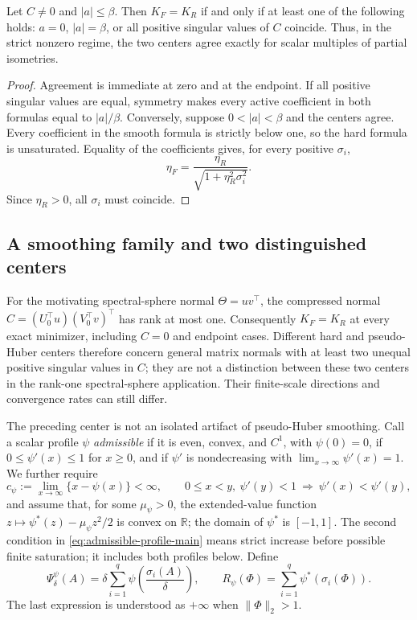 \begin{corollary}
\label{cor:center-agreement-main}
Let \(C\ne0\) and \(|a|\le\beta\).  Then \(K_F=K_R\) if and only if at least
one of the following holds: \(a=0\), \(|a|=\beta\), or all positive singular
values of \(C\) coincide.  Thus, in the strict nonzero regime, the two centers
agree exactly for scalar multiples of partial isometries.
\end{corollary}

\begin{proof}
Agreement is immediate at zero and at the endpoint.  If all positive singular
values are equal, symmetry makes every active coefficient in both formulas
equal to \(|a|/\beta\).  Conversely, suppose
\(0<|a|<\beta\) and the centers agree.  Every coefficient in the smooth
formula is strictly below one, so the hard formula is unsaturated.  Equality
of the coefficients gives, for every positive \(\sigma_i\),
\[
 \eta_F=\frac{\eta_R}{\sqrt{1+\eta_R^2\sigma_i^2}}.
\]
Since \(\eta_R>0\), all \(\sigma_i\) must coincide.
\end{proof}

\subsection{A smoothing family and two distinguished centers}

For the motivating spectral-sphere normal \(\Theta=uv^\top\), the
compressed normal \(C=(U_0^\top u)(V_0^\top v)^\top\) has rank at most
one.  Consequently \(K_F=K_R\) at every exact minimizer, including
\(C=0\) and endpoint cases.  Different hard and pseudo-Huber centers
therefore concern general matrix normals with at least two unequal positive
singular values in \(C\); they are not a distinction between these two
centers in the rank-one spectral-sphere application.  Their finite-scale
directions and convergence rates can still differ.

The preceding center is not an isolated artifact of pseudo-Huber smoothing.
Call a scalar profile \(\psi\) \emph{admissible} if it is even, convex, and
\(C^1\), with \(\psi(0)=0\), if \(0\le\psi'(x)\le1\) for \(x\ge0\), and if
\(\psi'\) is nondecreasing with \(\lim_{x\to\infty}\psi'(x)=1\).  We further require
\begin{equation}
 c_\psi:=\lim_{x\to\infty}\{x-\psi(x)\}<\infty,
 \qquad
 0\le x<y,\ \psi'(y)<1\ \Longrightarrow\ \psi'(x)<\psi'(y),
 \tag{A}
 \label{eq:admissible-profile-main}
\end{equation}
and assume that, for some \(\mu_\psi>0\), the extended-value function
\(z\mapsto\psi^*(z)-\mu_\psi z^2/2\) is convex on \(\mathbb R\); the domain
of \(\psi^*\) is \([-1,1]\).  The second condition in
\eqref{eq:admissible-profile-main} means strict increase before possible
finite saturation; it includes both profiles below.  Define
\begin{equation}
 \Psi_\delta^\psi(A)=\delta\sum_{i=1}^q
 \psi\!\left(\frac{\sigma_i(A)}{\delta}\right),
 \qquad
 R_\psi(\Phi)=\sum_{i=1}^q\psi^*(\sigma_i(\Phi)).
 \label{eq:profile-lifts-main}
\end{equation}
The last expression is understood as \(+\infty\) when
\(\|\Phi\|_2>1\).

